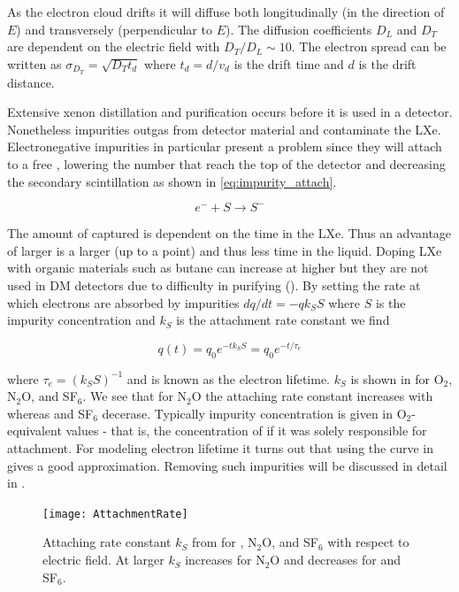 As the electron cloud drifts it will diffuse both longitudinally (in the direction of $E$) and transversely (perpendicular to $E$).  The
diffusion coefficients $D_{L}$ and $D_{T}$ are dependent on the electric field with $D_{T}/D_{L} \sim 10$.  The electron spread can
be written as $\sigma_{D_{T}} = \sqrt{D_{T} t_{d}}$ where $t_{d} = d/v_{d}$ is the drift time and $d$ is the drift distance.

Extensive xenon distillation and purification occurs before it is used in a detector.  Nonetheless impurities outgas from detector
material and contaminate the LXe.  Electronegative impurities in particular present a problem since they will attach to a free \electron,
lowering the number that reach the top of the detector and decreasing the secondary scintillation as shown in \eqref{eq:impurity_attach}.

\begin{equation}
e^{-} + S \rightarrow S^{-}
\label{eq:impurity_attach}
\end{equation}

\noindent The amount of \electron captured is dependent on the time in the LXe.  Thus an advantage of larger \efields is a larger
\vd (up to a point) and thus less time in the liquid.  Doping LXe with organic materials such as butane can increase \vd at higher
\efields but they are not used in DM detectors due to difficulty in purifying ().  By setting the rate at which
electrons are absorbed by impurities $dq/dt = -qk_{S}S$ where $S$ is the impurity concentration and $k_{S}$ is the attachment rate
constant we find

\begin{equation}
q(t) = q_{0}e^{-tk_{S}S} = q_{0}e^{-t/\tau_{e}}
\label{eq:lifetime_equation}
\end{equation}

\noindent where $\tau_{e} = (k_{S}S)^{-1}$ and is known as the electron lifetime.  $k_{S}$ is shown in  for
O$_{2}$,
N$_{2}$O, and SF$_{6}$.  We see that for N$_{2}$O the attaching rate constant increases with \efield whereas \otwo and SF$_{6}$
decerase.  Typically impurity concentration is given in O$_{2}$-equivalent values - that is, the concentration of \otwo if it was solely
responsible for \electron attachment.  For modeling electron lifetime it turns out that using the \otwo curve in
 gives a good approximation.  Removing such impurities will be discussed in detail in \secref{}.

\begin{figure}
\texttt{[image: AttachmentRate]}
\caption{Attaching rate constant $k_{S}$ from  for \otwo, N$_{2}$O, and SF$_{6}$ with respect to electric field.  At
larger \efield $k_{S}$ increases for N$_{2}$O and decreases for \otwo and SF$_{6}$.}
\label{fig:attachment_rate}
\end{figure}

